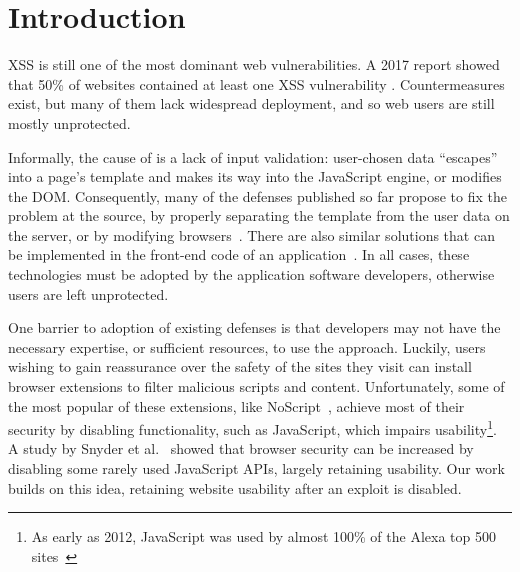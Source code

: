\section{Introduction} \label{introduction}

\ac{XSS} is still one of the most dominant web vulnerabilities. A 2017
report showed that 50\% of websites contained at least one \ac{XSS}
vulnerability \cite{Acunetix}. Countermeasures exist, but many of them
lack widespread deployment, and so web users are still mostly
unprotected.

Informally, the cause of \xss is a lack of input validation:
user-chosen data ``escapes'' into a page's template and makes its way
into the JavaScript engine, or modifies the DOM.
%
Consequently, many of the \xss defenses published so far
propose to fix the problem at the source, by properly separating the
template from the user data on the server, or by modifying
browsers~\cite{10.1145/1368088.1368112, Jim:2007:DSI:1242572.1242654,nadji2009document,Wurzinger:2009:SMX:1656360.1656379,Sundareswaran:2012:XHS:2352970.2352994}.
%
There are also similar solutions that can be implemented in the
front-end code of an application~\cite{10.1007/978-3-319-66399-9_7}.
In all cases, these technologies must be adopted by the application
software developers, otherwise users are left unprotected.

One barrier to adoption of existing \xss defenses is that developers may not have the
necessary expertise, or sufficient resources, to use the approach.
%
%
Luckily, users wishing to gain reassurance over the safety of the
sites they visit can install browser extensions to filter malicious
scripts and content. Unfortunately, some of the most popular of these
extensions, like NoScript~\cite{Noscript}, achieve most of their security
by disabling functionality, such as JavaScript, which
impairs usability\footnote{As early as 2012, 
JavaScript was used by almost 100\% of the Alexa top 500 sites~\cite{Stock:2017:WTI:3241189.3241265}}.
A study by Snyder et al.~\cite{Snyder:2017:MWD:3133956.3133966}
showed that browser security can be increased by disabling some rarely used
JavaScript APIs, largely retaining usability. Our work builds on this idea,
retaining website usability after an exploit is disabled.

